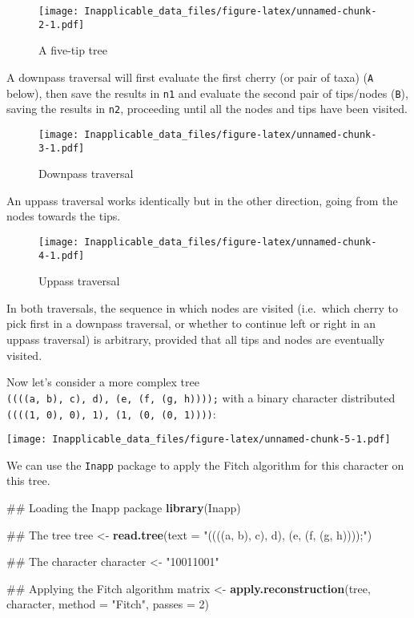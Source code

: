 \documentclass[]{book}
\newenvironment{Shaded}{\begin{snugshade}}{\end{snugshade}}
\newcommand{\KeywordTok}[1]{\textcolor[rgb]{0.13,0.29,0.53}{\textbf{#1}}}
\newcommand{\DataTypeTok}[1]{\textcolor[rgb]{0.13,0.29,0.53}{#1}}
\newcommand{\DecValTok}[1]{\textcolor[rgb]{0.00,0.00,0.81}{#1}}
\newcommand{\StringTok}[1]{\textcolor[rgb]{0.31,0.60,0.02}{#1}}
\newcommand{\NormalTok}[1]{#1}
\theoremstyle{definition}
\theoremstyle{definition}
\theoremstyle{definition}
\theoremstyle{remark}
\begin{document}
\begin{figure}
\centering
\texttt{[image: Inapplicable\_data\_files/figure-latex/unnamed-chunk-2-1.pdf]}
\caption{\label{fig:unnamed-chunk-2}A five-tip tree}
\end{figure}

A downpass traversal will first evaluate the first cherry (or pair of
taxa) (\texttt{A} below), then save the results in \texttt{n1} and
evaluate the second pair of tips/nodes (\texttt{B}), saving the results
in \texttt{n2}, proceeding until all the nodes and tips have been
visited.

\begin{figure}
\centering
\texttt{[image: Inapplicable\_data\_files/figure-latex/unnamed-chunk-3-1.pdf]}
\caption{\label{fig:unnamed-chunk-3}Downpass traversal}
\end{figure}

An uppass traversal works identically but in the other direction, going
from the nodes towards the tips.

\begin{figure}
\centering
\texttt{[image: Inapplicable\_data\_files/figure-latex/unnamed-chunk-4-1.pdf]}
\caption{\label{fig:unnamed-chunk-4}Uppass traversal}
\end{figure}

In both traversals, the sequence in which nodes are visited (i.e.~which
cherry to pick first in a downpass traversal, or whether to continue
left or right in an uppass traversal) is arbitrary, provided that all
tips and nodes are eventually visited.

Now let's consider a more complex tree
\texttt{((((a,\ b),\ c),\ d),\ (e,\ (f,\ (g,\ h))));} with a binary
character distributed
\texttt{((((1,\ 0),\ 0),\ 1),\ (1,\ (0,\ (0,\ 1))))}:

\texttt{[image: Inapplicable\_data\_files/figure-latex/unnamed-chunk-5-1.pdf]}

We can use the \texttt{Inapp} package to apply the Fitch algorithm for
this character on this tree.

\begin{Shaded}
\begin{Highlighting}[]
\NormalTok{## Loading the Inapp package}
\KeywordTok{library}\NormalTok{(Inapp)}

\NormalTok{## The tree}
\NormalTok{tree <-}\StringTok{ }\KeywordTok{read.tree}\NormalTok{(}\DataTypeTok{text =} \StringTok{"((((a, b), c), d), (e, (f, (g, h))));"}\NormalTok{)}

\NormalTok{## The character}
\NormalTok{character <-}\StringTok{ "10011001"}

\NormalTok{## Applying the Fitch algorithm}
\NormalTok{matrix <-}\StringTok{ }\KeywordTok{apply.reconstruction}\NormalTok{(tree, character, }\DataTypeTok{method =} \StringTok{"Fitch"}\NormalTok{, }\DataTypeTok{passes =} \DecValTok{2}\NormalTok{)}
\end{Highlighting}
\end{Shaded}
\end{document}
